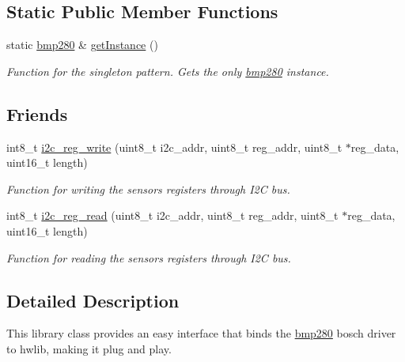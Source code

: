\subsection*{Static Public Member Functions}
\begin{DoxyCompactItemize}
\item 
\mbox{\label{classbmp280_a59268d6ba91891061090635edd6fc04b}} 
static \mbox{\hyperlink{classbmp280}{bmp280}} \& \mbox{\hyperlink{classbmp280_a59268d6ba91891061090635edd6fc04b}{get\+Instance}} ()
\begin{DoxyCompactList}\small\item\em Function for the singleton pattern. Gets the only \mbox{\hyperlink{classbmp280}{bmp280}} instance. \end{DoxyCompactList}\end{DoxyCompactItemize}
\subsection*{Friends}
\begin{DoxyCompactItemize}
\item 
int8\+\_\+t \mbox{\hyperlink{classbmp280_a6edf190f34f4a642def68cfafd8d3a7f}{i2c\+\_\+reg\+\_\+write}} (uint8\+\_\+t i2c\+\_\+addr, uint8\+\_\+t reg\+\_\+addr, uint8\+\_\+t $\ast$reg\+\_\+data, uint16\+\_\+t length)
\begin{DoxyCompactList}\small\item\em Function for writing the sensor\textquotesingle{}s registers through I2C bus. \end{DoxyCompactList}\item 
int8\+\_\+t \mbox{\hyperlink{classbmp280_a9ea4f460cdfc82cd4c695f0bfd43bdc6}{i2c\+\_\+reg\+\_\+read}} (uint8\+\_\+t i2c\+\_\+addr, uint8\+\_\+t reg\+\_\+addr, uint8\+\_\+t $\ast$reg\+\_\+data, uint16\+\_\+t length)
\begin{DoxyCompactList}\small\item\em Function for reading the sensor\textquotesingle{}s registers through I2C bus. \end{DoxyCompactList}\end{DoxyCompactItemize}


\subsection{Detailed Description}
This library class provides an easy interface that binds the \mbox{\hyperlink{classbmp280}{bmp280}} bosch driver to hwlib, making it \textquotesingle{}plug and play\textquotesingle{}. 

